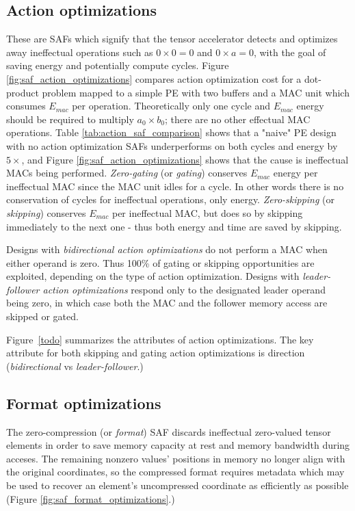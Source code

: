 \subsection{Action optimizations}

These are SAFs which signify that the tensor accelerator detects and optimizes away ineffectual operations such as $0 \times 0 = 0$ and $0 \times a = 0$, with the goal of saving energy and potentially compute cycles. Figure \ref{fig:saf_action_optimizations} compares action optimization cost for a dot-product problem mapped to a simple PE with two buffers and a MAC unit which consumes $E_{mac}$ per operation. Theoretically only one cycle and $E_{mac}$ energy should be required to multiply $a_0 \times b_0$; there are no other effectual MAC operations. Table \ref{tab:action_saf_comparison} shows that a "naive" PE design with no action optimization SAFs underperforms on both cycles and energy by $5\times$, and Figure \ref{fig:saf_action_optimizations} shows that the cause is ineffectual MACs being performed. \textit{Zero-gating} (or \textit{gating}) conserves $E_{mac}$ energy per ineffectual MAC since the MAC unit idles for a cycle. In other words there is no conservation of cycles for ineffectual operations, only energy. \textit{Zero-skipping} (or \textit{skipping}) conserves $E_{mac}$ per ineffectual MAC, but does so by skipping immediately to the next one - thus both energy and time are saved by skipping. 

Designs with \textit{bidirectional action optimizations} do not perform a MAC when either operand is zero. Thus 100\% of gating or skipping opportunities are exploited, depending on the type of action optimization. Designs with \textit{leader-follower action optimizations} respond only to the designated leader operand being zero, in which case both the MAC and the follower memory access are skipped or gated.

Figure~\ref{todo} summarizes the attributes of action optimizations. The key attribute for both skipping and gating action optimizations is direction (\textit{bidirectional} vs \textit{leader-follower}.)

%
\subsection{Format optimizations}

The zero-compression (or \textit{format}) SAF discards ineffectual zero-valued tensor elements in order to save memory capacity at rest and memory bandwidth during acceses. The remaining nonzero values' positions in memory no longer align with the original coordinates, so the compressed format requires metadata which may be used to recover an element's uncompressed coordinate as efficiently as possible (Figure \ref{fig:saf_format_optimizations}.) 

